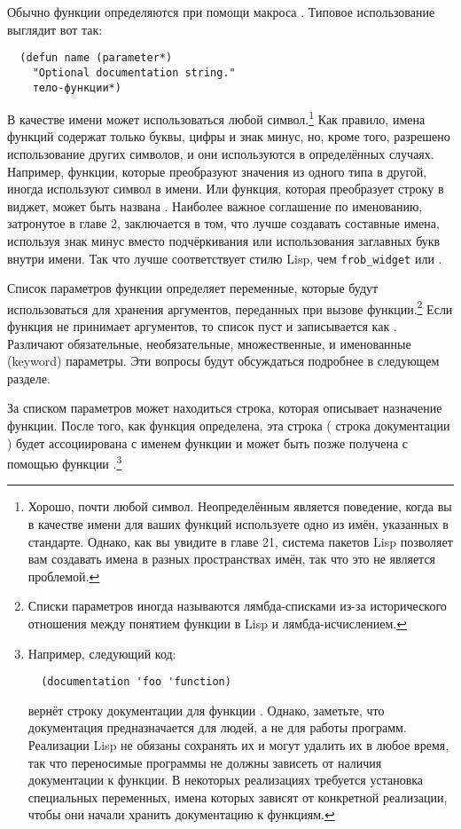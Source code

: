 Обычно функции определяются при помощи макроса .  Типовое использование
 выглядит вот так:

\begin{lstlisting}
  (defun name (parameter*)
    "Optional documentation string."
    тело-функции*)
\end{lstlisting}

В качестве имени может использоваться любой символ.\footnote{Хорошо, почти любой символ.
  Неопределённым является поведение, когда вы в качестве имени для ваших функций
  используете одно из имён, указанных в стандарте.  Однако, как вы увидите в главе 21,
  система пакетов Lisp позволяет вам создавать имена в разных пространствах имён, так что
  это не является проблемой.}  Как правило, имена функций содержат только буквы, цифры и
знак минус, но, кроме того, разрешено использование других символов, и они используются в
определённых случаях.  Например, функции, которые преобразуют значения из одного типа в
другой, иногда используют символ \code{->} в имени. Или функция, которая преобразует
строку в виджет, может быть названа .  Наиболее важное соглашение по
именованию, затронутое в главе 2, заключается в том, что лучше создавать составные имена,
используя знак минус вместо подчёркивания или использования заглавных букв внутри имени.
Так что  лучше соответствует стилю Lisp, чем \lstinline!frob_widget! или
.

Список параметров функции определяет переменные, которые будут использоваться для хранения
аргументов, переданных при вызове функции.\footnote{Списки параметров иногда называются
  лямбда-списками из-за исторического отношения между понятием функции в Lisp и
  лямбда-исчислением.}  Если функция не принимает аргументов, то список пуст и
записывается как \code{()}. Различают обязательные, необязательные, множественные, и
именованные (keyword) параметры.  Эти вопросы будут обсуждаться подробнее в следующем
разделе.

За списком параметров может находиться строка, которая описывает назначение функции.
После того, как функция определена, эта строка ( строка документации ) будет ассоциирована
с именем функции и может быть позже получена с помощью функции
.\footnote{Например, следующий код:

\begin{lstlisting}
  (documentation 'foo 'function)
\end{lstlisting}

вернёт строку документации для функции .  Однако, заметьте, что документация
предназначается для людей, а не для работы программ.  Реализации Lisp не обязаны сохранять
их и могут удалить их в любое время, так что переносимые программы не должны
зависеть от наличия документации к функции.  В некоторых реализациях требуется установка
специальных переменных, имена которых зависят от конкретной реализации, чтобы они начали
хранить документацию к функциям.}

